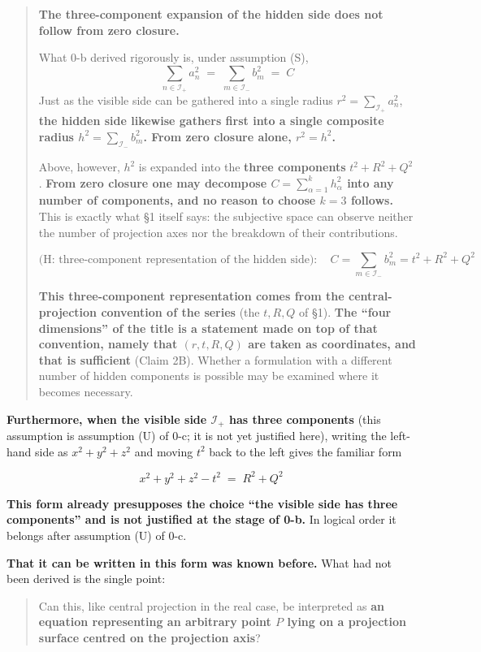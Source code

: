 \documentclass[
  10pt,
]{article}
\begin{document}
\begin{quote}
\textbf{The three-component expansion of the hidden side does not follow
from zero closure.}

What 0-b derived rigorously is, under assumption (S),
\[\sum_{n\in\mathcal{I}_+}a_n^2 \;=\; \sum_{m\in\mathcal{I}_-}b_m^2 \;=\; C\]
Just as the visible side can be gathered into a single radius
\(r^2 = \sum_{\mathcal{I}_+}a_n^2\), \textbf{the hidden side likewise
gathers first into a single composite radius
\(h^2 = \sum_{\mathcal{I}_-}b_m^2\). From zero closure alone,
\(r^2 = h^2\).}

Above, however, \(h^2\) is expanded into the \textbf{three components}
\(t^2+R^2+Q^2\). \textbf{From zero closure one may decompose
\(C = \sum_{\alpha=1}^{k}h_\alpha^2\) into any number of components, and
no reason to choose \(k=3\) follows.} This is exactly what §1 itself
says: the subjective space can observe neither the number of projection
axes nor the breakdown of their contributions.

\[\text{(H: three-component representation of the hidden side)}:\quad C = \sum_{m\in\mathcal{I}_-}b_m^2 = t^2 + R^2 + Q^2\]

\textbf{This three-component representation comes from the
central-projection convention of the series} (the \(t, R, Q\) of §1).
\textbf{The ``four dimensions'' of the title is a statement made on top
of that convention, namely that \((r,t,R,Q)\) are taken as coordinates,
and that is sufficient} (Claim 2B). Whether a formulation with a
different number of hidden components is possible may be examined where
it becomes necessary.
\end{quote}

\textbf{Furthermore, when the visible side \(\mathcal{I}_+\) has three
components} (this assumption is assumption (U) of 0-c; it is not yet
justified here), writing the left-hand side as \(x^2+y^2+z^2\) and
moving \(t^2\) back to the left gives the familiar form

\[x^2 + y^2 + z^2 - t^2 \;=\; R^2 + Q^2\]

\textbf{This form already presupposes the choice ``the visible side has
three components'' and is not justified at the stage of 0-b.} In logical
order it belongs after assumption (U) of 0-c.

\textbf{That it can be written in this form was known before.} What had
not been derived is the single point:

\begin{quote}
Can this, like central projection in the real case, be interpreted as
\textbf{an equation representing an arbitrary point \(P\) lying on a
projection surface centred on the projection axis}?
\end{quote}
\end{document}

